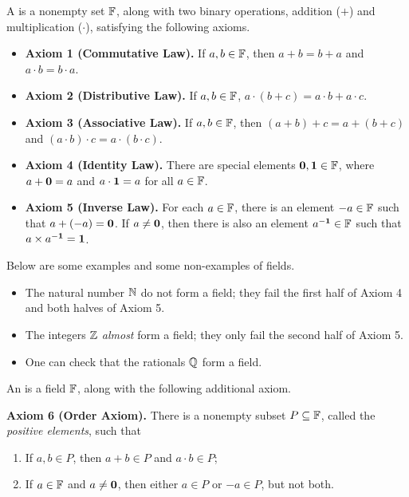 \documentclass[11pt,twoside=off,numbers=noenddot]{scrbook}
\begin{document}
\begin{definition}[Fields]
    A  is a nonempty set $\mathbb F$, along with two binary operations, addition ($+$) and multiplication ($\cdot$), satisfying the following axioms.
    \begin{itemize}
        \item \textbf{Axiom 1 (Commutative Law).} If $a, b \in \mathbb F$, then $a + b = b + a$ and $a \cdot b = b \cdot a$.
        \item \textbf{Axiom 2 (Distributive Law).} If $a, b \in \mathbb F$, $a \cdot (b + c) = a \cdot b + a \cdot c$.
        \item \textbf{Axiom 3 (Associative Law).} If $a, b \in \mathbb F$, then $(a + b) + c = a + (b + c)$ and $(a \cdot b) \cdot c = a \cdot (b \cdot c)$.
        \item \textbf{Axiom 4 (Identity Law).} There are special elements $\textbf{0}, \textbf{1} \in \mathbb F$, where $a + \textbf{0} = a$ and $a \cdot \textbf{1} = a$ for all $a \in \mathbb F$.
        \item \textbf{Axiom 5 (Inverse Law).} For each $a \in \mathbb F$, there is an element $-a \in \mathbb F$ such that $a + (-a) = \textbf{0}$. If $a \neq \textbf{0}$, then there is also an element $a^{-\textbf{1}} \in \mathbb F$ such that $a \times a^{-\textbf{1}} = \textbf{1}$.
    \end{itemize}
\end{definition}

\begin{example}
    Below are some examples and some non-examples of fields.
    \begin{itemize}
        \item The natural number $\mathbb N$ do not form a field; they fail the first half of Axiom 4 and both halves of Axiom 5.
        \item The integers $\mathbb Z$ \textit{almost} form a field; they only fail the second half of Axiom 5.
        \item One can check that the rationals $\mathbb Q$ form a field.
    \end{itemize}
\end{example}

\begin{definition}
    An  is a field $\mathbb F$, along with the following additional axiom.

    \textbf{Axiom 6 (Order Axiom).} There is a nonempty subset $P \subseteq \mathbb F$, called the \textit{positive elements}, such that
    \begin{enumerate}
        \item If $a, b \in P$, then $a + b \in P$ and $a \cdot b \in P$;
        \item If $a \in \mathbb F$ and $a \neq \textbf{0}$, then either $a \in P$ or $-a \in P$, but not both.
    \end{enumerate}
\end{definition}
\end{document}
